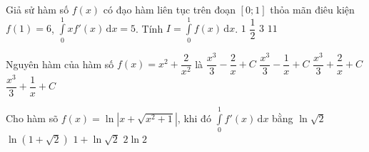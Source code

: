 \begin{ex}%
Giả sử hàm số $f(x)$ có đạo hàm liên tục trên đoạn $[0; 1]$ thỏa mãn điêu kiện $f(1)=6$, $\displaystyle\int\limits_0^1 x f'(x)\mathrm{\,d}x=5$. Tính $I=\displaystyle\int\limits_0^1 f(x)\mathrm{\,d}x$.
\choice
{\True $1$}
{$\dfrac{1}{2}$}
{$3$}
{$11$}
\end{ex}

\begin{ex}%
Nguyên hàm của hàm số $f(x)=x^2+\dfrac{2}{x^2}$ là
\choice
{\True $\dfrac{x^3}{3}-\dfrac{2}{x}+C$}
{$\dfrac{x^3}{3}-\dfrac{1}{x}+C$}
{$\dfrac{x^3}{3}+\dfrac{2}{x}+C$}
{$\dfrac{x^3}{3}+\dfrac{1}{x}+C$}
\end{ex}

\begin{ex}%
Cho hàm sõ $f(x)=\ln \left|x+\sqrt{x^2+1}\right|$, khi đó $\displaystyle\int\limits_0^1 f'(x)\mathrm{\,d}x$ bằng
\choice
{$\ln \sqrt{2}$}
{\True $\ln (1+\sqrt{2})$}
{$1+\ln \sqrt{2}$}
{$2 \ln 2$}
\end{ex}

